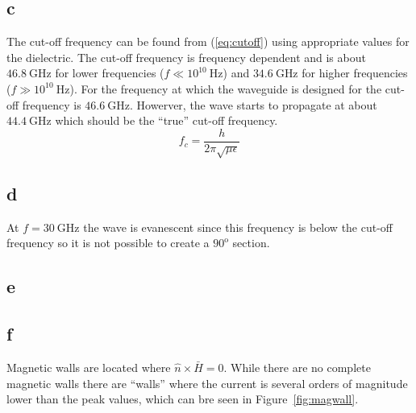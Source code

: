 \documentclass{article}
\begin{document}
\subsection{c}\label{sec:c}
The cut-off frequency can be found from (\ref{eq:cutoff}) using appropriate values for the dielectric. The cut-off frequency is frequency dependent and is about $\SI{46.8}{\giga\hertz}$ for lower frequencies ($f \ll 10^{10}\SI{}{\hertz}$) and $\SI{34.6}{\giga\hertz}$ for higher frequencies ($f \gg 10^{10}\SI{}{\hertz}$). For the frequency at which the waveguide is designed for the cut-off frequency is $\SI{46.6}{\giga\hertz}$. Howerver, the wave starts to propagate at about $\SI{44.4}{\giga\hertz}$ which should be the ``true'' cut-off frequency.
\begin{equation}
  f_c = \dfrac{h}{2\pi\sqrt{\mu\epsilon}}
  \label{eq:cutoff}
\end{equation}


\subsection{d}\label{sec:d}
At $f=\SI{30}{\giga\hertz}$ the wave is evanescent since this frequency is below the cut-off frequency so it is not possible to create a $90^\text{o}$ section.

\subsection{e}\label{sec:d}

\subsection{f}\label{sec:d}
Magnetic walls are located where $\hat{n}\times\bar{H}=0$. While there are no complete magnetic walls there are ``walls'' where the current is several orders of magnitude lower than the peak values, which can bre seen in Figure~\ref{fig:magwall}.
\end{document}
